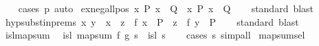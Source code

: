 \begin{isabellebody}
%
\isadelimproof
\ \ %
\endisadelimproof
%
\isatagproof
{}\isamarkupfalse%
\ {\isacharparenleft}{\kern0pt}cases\ p{\isacharparenright}{\kern0pt}\ auto%
\endisatagproof
{\isafoldproof}%
%
\isadelimproof
\isanewline
%
\endisadelimproof
\isanewline
{}\isamarkupfalse%
\ ex{\isacharunderscore}{\kern0pt}neg{\isacharunderscore}{\kern0pt}all{\isacharunderscore}{\kern0pt}pos{\isacharcolon}{\kern0pt}\ {\isachardoublequoteopen}{\isacharparenleft}{\kern0pt}{\isacharparenleft}{\kern0pt}{\isasymexists}x{\isachardot}{\kern0pt}\ P\ x{\isacharparenright}{\kern0pt}\ {\isasymLongrightarrow}\ Q{\isacharparenright}{\kern0pt}\ {\isasymequiv}\ {\isacharparenleft}{\kern0pt}{\isasymAnd}x{\isachardot}{\kern0pt}\ P\ x\ {\isasymLongrightarrow}\ Q{\isacharparenright}{\kern0pt}{\isachardoublequoteclose}\isanewline
%
\isadelimproof
\ \ %
\endisadelimproof
%
\isatagproof
{}\isamarkupfalse%
\ standard\ blast{\isacharplus}{\kern0pt}%
\endisatagproof
{\isafoldproof}%
%
\isadelimproof
\isanewline
%
\endisadelimproof
\isanewline
{}\isamarkupfalse%
\ hypsubst{\isacharunderscore}{\kern0pt}in{\isacharunderscore}{\kern0pt}prems{\isacharcolon}{\kern0pt}\ {\isachardoublequoteopen}{\isacharparenleft}{\kern0pt}{\isasymAnd}x{\isachardot}{\kern0pt}\ y\ {\isacharequal}{\kern0pt}\ x\ {\isasymLongrightarrow}\ z\ {\isacharequal}{\kern0pt}\ f\ x\ {\isasymLongrightarrow}\ P{\isacharparenright}{\kern0pt}\ {\isasymequiv}\ {\isacharparenleft}{\kern0pt}z\ {\isacharequal}{\kern0pt}\ f\ y\ {\isasymLongrightarrow}\ P{\isacharparenright}{\kern0pt}{\isachardoublequoteclose}\isanewline
%
\isadelimproof
\ \ %
\endisadelimproof
%
\isatagproof
{}\isamarkupfalse%
\ standard\ blast{\isacharplus}{\kern0pt}%
\endisatagproof
{\isafoldproof}%
%
\isadelimproof
\isanewline
%
\endisadelimproof
\isanewline
{}\isamarkupfalse%
\ isl{\isacharunderscore}{\kern0pt}map{\isacharunderscore}{\kern0pt}sum{\isacharcolon}{\kern0pt}\isanewline
\ \ {\isachardoublequoteopen}isl\ {\isacharparenleft}{\kern0pt}map{\isacharunderscore}{\kern0pt}sum\ f\ g\ s{\isacharparenright}{\kern0pt}\ {\isacharequal}{\kern0pt}\ isl\ s{\isachardoublequoteclose}\isanewline
%
\isadelimproof
\ \ %
\endisadelimproof
%
\isatagproof
{}\isamarkupfalse%
\ {\isacharparenleft}{\kern0pt}cases\ s{\isacharparenright}{\kern0pt}\ simp{\isacharunderscore}{\kern0pt}all%
\endisatagproof
{\isafoldproof}%
%
\isadelimproof
\isanewline
%
\endisadelimproof
\isanewline
{}\isamarkupfalse%
\ map{\isacharunderscore}{\kern0pt}sum{\isacharunderscore}{\kern0pt}sel{\isacharcolon}{\kern0pt}\isanewline

\end{isabellebody}
